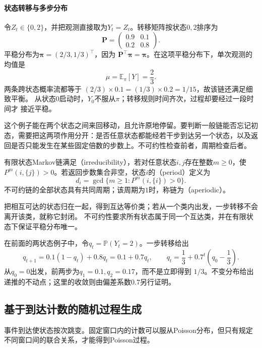 \paragraph{状态转移与多步分布}
\begin{example}[相关的两状态观测]
  \label{ex:stoch-two-state-chain}
  令$Z_t\in\{0,2\}$，并把观测直接取为$Y_t=Z_t$。转移矩阵按状态$0,2$排序为
  \[
    \bm{P}
    =
    \begin{pmatrix}
      0.9 & 0.1\\
      0.2 & 0.8
    \end{pmatrix}.
  \]
  平稳分布为$\bm{\pi}=(2/3,1/3)^\top$，因为
  $\bm{P}^{\top}\bm{\pi}=\bm{\pi}$。在这项平稳分布下，单次观测的均值是
  \[
    \mu=\mathbb{E}_{\pi}[Y]=\frac23.
  \]
  两条跨状态概率流都等于
  $(2/3)\times0.1=(1/3)\times0.2=1/15$，故该链还满足细致平衡。
  从状态$0$启动时，$Y_0$不服从$\pi$；转移规则时间齐次，过程却要经过一段时间才
  接近平稳。
\end{example}
这个例子能在两个状态之间来回移动，且允许原地停留。要判断一般链能否忘记初态，需要把这两项作用分开：是否任意状态都能经若干步到达另一个状态，以及返回是否只能发生在某些固定倍数的步数上。不可约性检查前者，周期检查后者。
\begin{definition}[有限链的不可约性与周期]
  \label{def:stoch-finite-irreducibility-period}
  有限状态Markov链满足（irreducibility），若对任意状态\(i,j\)存在整数\(m\geq0\)，使\(P^m(i,\{j\})>0\)。若返回步数集合非空，状态\(i\)的（period）定义为
  \[ d_i=\gcd\{m\geq1:P^m(i,\{i\})>0\}. \]
  不可约链的全部状态具有共同周期；该周期为\(1\)时，称链为（aperiodic）。
\end{definition}
把相互可达的状态归在一起，得到互达等价类；若从一个类内出发，一步转移不会离开该类，就称它封闭。
不可约性要求所有状态属于同一个互达类，并在有限状态下保证平稳分布唯一。

在前面的两状态例子中，令\(q_t=\mathbb P(Y_t=2)\)。一步转移给出
\[
q_{t+1}=0.1(1-q_t)+0.8q_t=0.1+0.7q_t,
\qquad q_t=\frac13+0.7^t\left(q_0-\frac13\right).
\]
从\(q_0=0\)出发，前两步为\(q_1=0.1,q_2=0.17\)，而不是立即得到
\(1/3\)。不变分布给出递推的不动点；这里的收敛则由偏差系数\(0.7\)另行证明。

\subsection{基于到达计数的随机过程生成}
\label{sec:rv-poisson}
事件到达使状态按次跳变。固定窗口内的计数可以服从Poisson分布，但只有规定不同窗口间的联合关系，才能得到Poisson过程。

